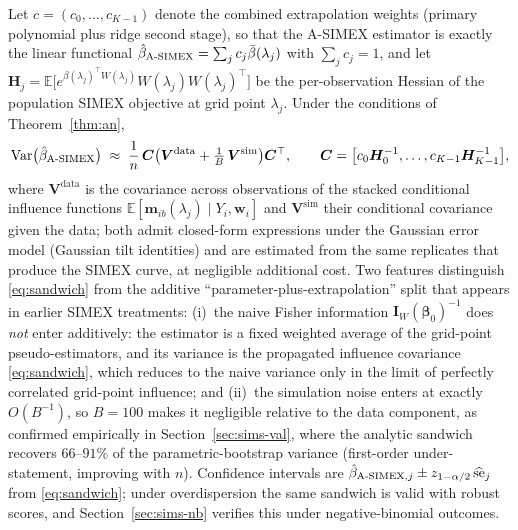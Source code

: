 \documentclass[3p,11pt]{elsarticle}
\theoremstyle{plain}
\theoremstyle{definition}
\newcommand{\E}{\mathbb{E}}
\newcommand{\Var}{\mathrm{Var}}
\newcommand{\bet}{\bm{\beta}}
\newcommand{\bw}{\bm{w}}
\newcommand{\btV}{\bm{V}}
\newcommand{\asimex}{\textup{A-SIMEX}}
\begin{document}
Let $c=(c_0,\dots,c_{K-1})$ denote the combined extrapolation weights
(primary polynomial plus ridge second stage), so that the A-SIMEX
estimator is exactly the linear functional
$\hat\beta_{\asimex}=\sum_jc_j\bar\beta(\lambda_j)$ with
$\sum_jc_j=1$, and let
$\bm H_j=\E\bigl[e^{\beta(\lambda_j)^\top W(\lambda_j)}
W(\lambda_j)W(\lambda_j)^\top\bigr]$ be the per-observation Hessian of
the population SIMEX objective at grid point $\lambda_j$. Under the
conditions of Theorem~\ref{thm:an},
\begin{equation}\label{eq:sandwich}
  \Var\bigl(\hat\beta_{\asimex}\bigr)\;\approx\;\frac1n\,\bm C
  \bigl(\btV^{\mathrm{data}}+\tfrac1B\,\btV^{\mathrm{sim}}\bigr)
  \bm C^\top,
  \qquad
  \bm C=\bigl[c_0\bm H_0^{-1},\dots,c_{K-1}\bm H_{K-1}^{-1}\bigr],
\end{equation}
where $\btV^{\mathrm{data}}$ is the covariance across observations of
the stacked conditional influence functions
$\E[\bm m_{ib}(\lambda_j)\mid Y_i,\bw_i]$ and
$\btV^{\mathrm{sim}}$ their conditional covariance given the data;
both admit closed-form expressions under the Gaussian error model
(Gaussian tilt identities) and are estimated from the same replicates
that produce the SIMEX curve, at negligible additional cost.
Two features distinguish \eqref{eq:sandwich} from the additive
``parameter-plus-extrapolation'' split that appears in earlier SIMEX
treatments: (i)~the naive Fisher information
$\bm I_W(\bet_0)^{-1}$ does \emph{not} enter additively: the
estimator is a fixed weighted average of the grid-point
pseudo-estimators, and its variance is the propagated influence
covariance \eqref{eq:sandwich}, which reduces to the naive variance
only in the limit of perfectly correlated grid-point influence; and
(ii)~the simulation noise enters at exactly $O(B^{-1})$, so $B=100$
makes it negligible relative to the data component, as confirmed
empirically in Section~\ref{sec:sims-val}, where the analytic sandwich
recovers $66$--$91\%$ of the parametric-bootstrap variance
(first-order under-statement, improving with $n$). Confidence
intervals are $\hat\beta_{\asimex,j}\pm
z_{1-\alpha/2}\,\widehat{\mathrm{se}}_j$ from
\eqref{eq:sandwich}; under overdispersion the same sandwich is valid
with robust scores, and Section~\ref{sec:sims-nb} verifies this under
negative-binomial outcomes.
\end{document}
